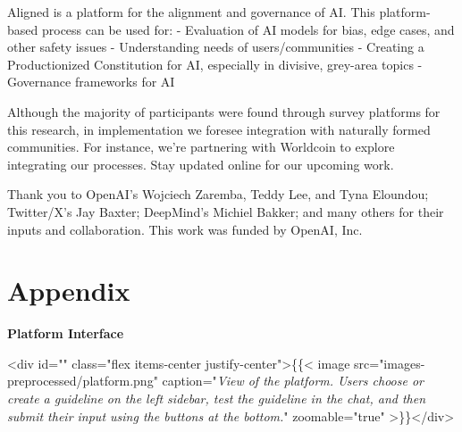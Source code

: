 \documentclass{article}
\begin{document}
\begin{multicols}{2}
Aligned is a platform for the alignment and governance of AI. This platform-based process can be used for:
-  Evaluation of AI models for bias, edge cases, and other safety issues
-  Understanding needs of users/communities
-  Creating a Productionized Constitution for AI, especially in divisive, grey-area topics
-  Governance frameworks for AI

Although the majority of participants were found through survey platforms for this research, in implementation we foresee integration with naturally formed communities. For instance, we're partnering with Worldcoin to explore integrating our processes. Stay updated online for our upcoming work.

Thank you to OpenAI’s Wojciech Zaremba, Teddy Lee, and Tyna Eloundou; Twitter/X’s Jay Baxter; DeepMind's Michiel Bakker; and many others for their inputs and collaboration. This work was funded by OpenAI, Inc.

\end{multicols}

\newpage
\RaggedRight


\newpage
{}
\section{Appendix}

\vspace{10pt}
\textbf{\large Platform Interface}\centering

<div id="" class="flex items-center justify-center">\{\{< image src="images-preprocessed/platform.png" caption="\textit{View of the platform. Users choose or create a guideline on the left sidebar, test the guideline in the chat, and then submit their input using the buttons at the bottom.}" zoomable="true" >\}\}</div>



\vspace{10pt}
\end{document}
